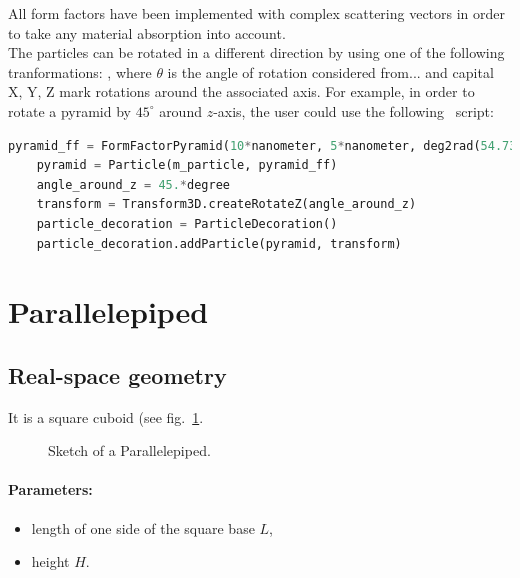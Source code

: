 All form factors have been implemented with complex scattering vectors
in order to take any material absorption into account.\\


The particles can be rotated in a different direction by using one of
the following tranformations: , where $\theta$ is the
angle of rotation considered from... and capital X, Y, Z mark rotations
around the associated axis. For example, in order to rotate a pyramid by $45^{\circ}$ around
$z$-axis, the user could use the following \ script:\\

\begin{lstlisting}[language=python, style=eclipseboxed,numbers=none,nolol]
    pyramid_ff = FormFactorPyramid(10*nanometer, 5*nanometer, deg2rad(54.73 ) )
    pyramid = Particle(m_particle, pyramid_ff)
    angle_around_z = 45.*degree
    transform = Transform3D.createRotateZ(angle_around_z)
    particle_decoration = ParticleDecoration()
    particle_decoration.addParticle(pyramid, transform) 
\end{lstlisting}

\newpage
\section{Parallelepiped}   

\subsection{Real-space geometry}
It is a square cuboid (see fig.~\ref{parallelepiped}.

\begin{figure}[ht]
\begin{center}
\caption{Sketch of a Parallelepiped.}
\end{center}
\label{parallelepiped}
\end{figure}

\paragraph{Parameters:}
\begin{itemize}
\item length of one side of the square base $L$,
\item height $H$.
\end{itemize}

